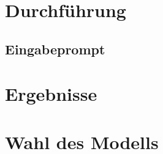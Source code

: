 
\section{Durchführung}\label{sec:durchfuhrung-benchmark}


\subsection{Eingabeprompt}


\section{Ergebnisse}\label{sec:ergebnisse-benchmark}


\section{Wahl des Modells}\label{sec:auswahl-modell-benchmark}
